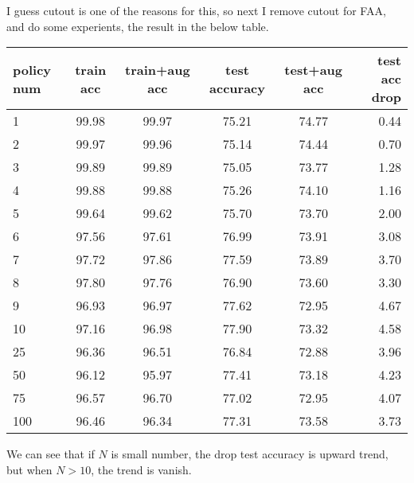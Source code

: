 I guess cutout is one of the reasons for this, so next I remove cutout for FAA, and do some experients, the result in the below table.\\
\begin{tabular}{| l | c | c | c | c | r |}
	\hline
	policy num   & train acc & train+aug acc & test accuracy  &  test+aug acc & test acc drop\\
	\hline
	1          &  99.98   & 99.97       &  75.21         &   74.77            &  0.44\\
	\hline
	2          &  99.97   & 99.96       &  75.14         &   74.44            &  0.70\\
	\hline
	3          &  99.89   & 99.89       &  75.05         &   73.77            &  1.28\\
	\hline
	4          &  99.88   & 99.88       &  75.26         &   74.10            &  1.16\\
	\hline
	5          &  99.64   & 99.62       &  75.70         &   73.70            &  2.00\\
	\hline
	6          &  97.56   & 97.61       &  76.99         &   73.91            &  3.08\\
	\hline
	7          &  97.72   & 97.86       &  77.59         &   73.89            &  3.70\\
	\hline
	8          &  97.80   & 97.76       &  76.90         &   73.60            &  3.30\\
	\hline
	9          &  96.93   & 96.97       &  77.62         &   72.95            &  4.67\\
	\hline
	10         &  97.16   & 96.98       &  77.90         &   73.32            &  4.58\\
	\hline
	25         &  96.36   & 96.51       &  76.84         &   72.88            &  3.96\\
	\hline
	50         &  96.12   & 95.97       &  77.41         &   73.18            &  4.23\\
	\hline
	75         &  96.57   & 96.70       &  77.02         &   72.95            &  4.07\\
	\hline
	100        &  96.46   & 96.34       &  77.31         &   73.58            &  3.73\\
	\hline
\end{tabular}

We can see that if $N$ is small number, the drop test accuracy is upward trend, but when $N>10$, the trend is vanish.\\

